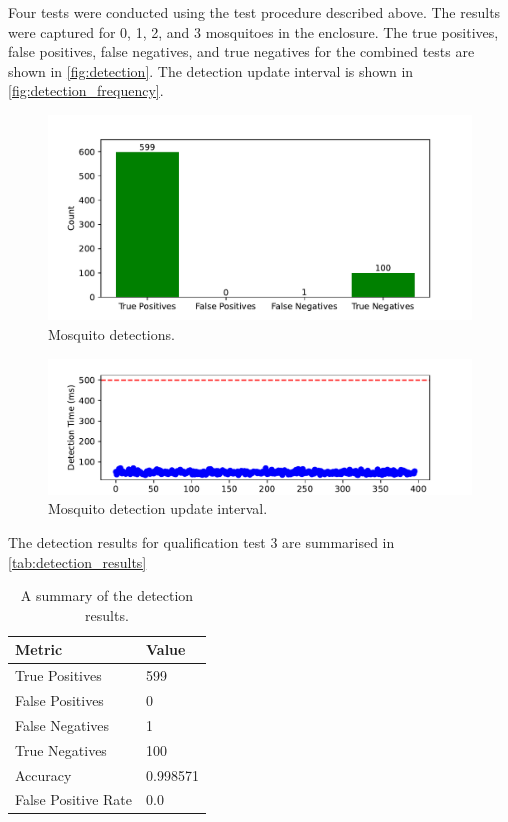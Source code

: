 Four tests were conducted using the test procedure described above. The results were captured for 0, 1, 2, and 3 mosquitoes in the enclosure. The true positives, false positives, false negatives, and true negatives for the combined tests are shown in \autoref{fig:detection}. The detection update interval is shown in \autoref{fig:detection_frequency}.
\begin{figure}[!htb]
  \centering
  \includegraphics[width=\textwidth]{figures/results/detection.pdf}
  \caption{Mosquito detections.}
  \label{fig:detection}
\end{figure}
\begin{figure}[!htb]
  \centering
  \includegraphics[width=\textwidth]{figures/results/detection_frequency.pdf}
  \caption{Mosquito detection update interval.}
  \label{fig:detection_frequency}
\end{figure}
The detection results for qualification test 3 are summarised in \autoref{tab:detection_results}
\begin{table}[!htb]
  \centering
  \begin{tabular}{|l|l|}
    \hline
    \textbf{Metric}     & \textbf{Value} \\
    \hline
    True Positives      & 599            \\
    False Positives     & 0              \\
    False Negatives     & 1              \\
    True Negatives      & 100            \\
    Accuracy            & 0.998571       \\
    False Positive Rate & 0.0            \\
    \hline
  \end{tabular}
  \caption{A summary of the detection results.}
  \label{tab:detection_results}
\end{table}

